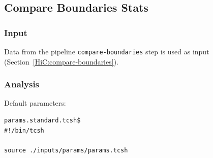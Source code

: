 \subsection{Compare Boundaries Stats}\label{HiC:compare-boundaries-stats}%
\subsubsection{Input} %
Data from the pipeline \texttt{compare-boundaries} step is used as input (Section~\ref{HiC:compare-boundaries}).
\subsubsection{Analysis} %
Default parameters:
\begin{lstlisting}
params.standard.tcsh$
#!/bin/tcsh

source ./inputs/params/params.tcsh
\end{lstlisting}
